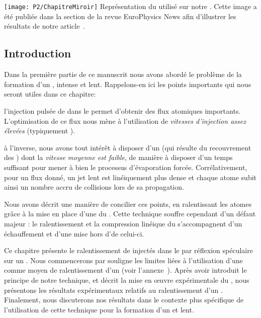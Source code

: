 \chapter{\TitreChapitreTrois}\label{chap:MiroirMobile}

\bfigh
\texttt{[image: P2/ChapitreMiroir]}
{Représentation du \mimo utilisé sur notre \gm. Cette image a été publiée dans la section  de la revue EuroPhysics News afin d'illustrer les résultats de notre article~\cite{RWC06}.}%
\efigh

\pagebreak

\minitoc

\section{Introduction}
Dans la première partie de ce manuscrit nous avons abordé le problème de la formation d'un \jatg, intense et lent. Rappelons-en ici les points importants qui nous seront utiles dans ce chapitre:
\begin{itemizel}
	\item l'injection pulsée de \pats dans le \gm permet d'obtenir des flux atomiques importants. L'optimisation de ce flux nous mène à l'utilisation de \emph{vitesses d'injection assez élevées} (typiquement ).
	\item à l'inverse, nous avons tout intérêt à disposer d'un \jat (qui résulte du recouvrement des \pats) dont la \emph{vitesse moyenne est faible}, de manière à disposer d'un temps suffisant pour mener à bien le processus d'évaporation forcée. Corrélativement, pour un flux donné, un jet lent est linéiquement plus dense et chaque atome subit ainsi un nombre accru de collisions lors de sa propagation.
\end{itemizel}
Nous avons décrit une manière de concilier ces points, en ralentissant les atomes grâce à la mise en place d'une \secpent du \gm. Cette technique souffre cependant d'un défaut majeur : le ralentissement et la compression linéique du \jat s'accompagnent d'un échauffement et d'une mise hors d'\eqthdy de celui-ci.

\casse

Ce chapitre présente le ralentissement de \pats injectés dans le \gm par réflexion spéculaire sur un \mimamo. %
Nous commencerons par souligne les limites liées à l'utilisation d'une \secpent comme moyen de ralentissement d'un \jat (voir l'annexe~).
Après avoir introduit le principe de notre technique, et décrit la mise en \oe uvre expérimentale du \mima, nous présentons les résultats expérimentaux relatifs au ralentissement d'un \pat.
Finalement, nous discuterons nos résultats dans le contexte plus spécifique de l'utilisation de cette technique pour la formation d'un \jatuf et lent. 

